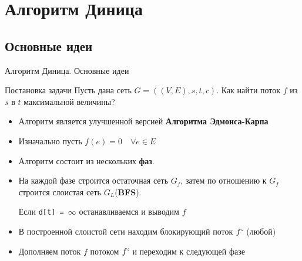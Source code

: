 \documentclass{beamer}
\begin{document}
\section{Алгоритм Диница}

\subsection{Основные идеи}

\begin{frame}{Алгоритм Диница. Основные идеи}
    \begin{block}{Постановка задачи}
    Пусть дана сеть $G = ((V, E), s, t, c)$. Как найти поток $f$ из $s$ в $t$ максимальной величины?
    \end{block}
    \begin{itemize}
        \item {
        Алгоритм является улучшенной версией \textbf{Алгоритма Эдмонса-Карпа}
        \pause
        }
        \item {
        Изначально пусть $f(e) = 0 \quad \forall e \in E$
        \pause
        }
        \item {
        Алгоритм состоит из нескольких \textbf{фаз}.
        \pause
        }
        \item {
        На каждой фазе строится остаточная сеть \textbf{$G_f$}, затем по отношению к $G_f$ строится слоистая сеть $G_{L}$(\textbf{BFS}). 
        
        Если \texttt{d[t] = $\infty$} останавливаемся и выводим $f$
        \pause
        }
        \item {
        В построенной слоистой сети находим блокирующий поток $f`$ (любой)
        \pause
        }
        \item {
        Дополняем поток $f$ потоком $f`$ и переходим к следующей фазе
        }
    \end{itemize}
\end{frame}
\end{document}
